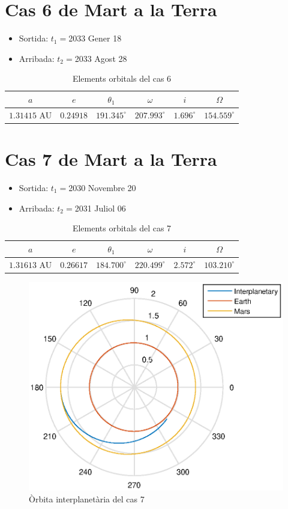 \section{Cas 6 de Mart a la Terra}
\begin{itemize}
	\item Sortida: $t_{1}=$2033 Gener 18
	\item Arribada: $t_{2}=$2033 Agost 28
\end{itemize}
\begin{table}[h!]
	\centering
	\begin{tabular}{ |c|c|c|c|c|c|}
		\hline
		$a$ & $e$ & $\theta_{1}$ & $\omega$ & $i$ & $\Omega$ \\ \hline
		$1.31415$ AU  & $0.24918$ & $191.345^{\circ}$ & $207.993^{\circ}$ & $1.696^{\circ}$ & $154.559^{\circ}$ \\ \hline
	\end{tabular}
	\caption{Elements orbitals del cas 6}
\end{table}

\section{Cas 7 de Mart a la Terra}
\begin{itemize}
	\item Sortida: $t_{1}=$2030 Novembre 20
	\item Arribada: $t_{2}=$2031 Juliol 06
\end{itemize}
\begin{table}[h!]
	\centering
	\begin{tabular}{ |c|c|c|c|c|c|}
		\hline
		$a$ & $e$ & $\theta_{1}$ & $\omega$ & $i$ & $\Omega$ \\ \hline
		$1.31613$ AU  & $0.26617$ & $184.700^{\circ}$ & $220.499^{\circ}$ & $2.572^{\circ}$ & $103.210^{\circ}$ \\ \hline
	\end{tabular}
	\caption{Elements orbitals del cas 7}
\end{table}
\begin{figure}[H]
	\centering
	\includegraphics[scale=0.95]{./plots/cas7}
	\caption{Òrbita interplanetària del cas 7}
\end{figure}

